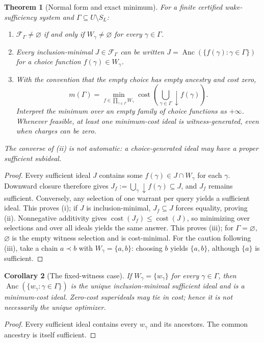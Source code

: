 \documentclass[10pt,letterpaper]{article}
\newtheorem{theorem}{Theorem}[section]
\newtheorem{corollary}[theorem]{Corollary}
\theoremstyle{definition}
\theoremstyle{remark}
\newcommand{\Anc}{\operatorname{Anc}}
\newcommand{\cost}{\operatorname{cost}}
\begin{document}
\begin{theorem}[Normal form and exact minimum]\label{thm:normal}
For a finite certified wake-sufficiency system and $\Gamma\subseteq U\setminus S_L$:
\begin{enumerate}[label=(\roman*)]
\item $\mathcal F_\Gamma\ne\varnothing$ if and only if $W_\gamma\ne\varnothing$ for every $\gamma\in\Gamma$.
\item Every \emph{inclusion-minimal} $J\in\mathcal F_\Gamma$ can be written $J=\Anc(\{f(\gamma):\gamma\in\Gamma\})$ for a choice function $f(\gamma)\in W_\gamma$.
\item With the convention that the empty choice has empty ancestry and cost zero,
\begin{equation}\label{eq:minimum}
m(\Gamma)=\min_{f\in\prod_{\gamma\in\Gamma}W_\gamma}\cost\!\left(\bigcup_{\gamma\in\Gamma}\downarrow f(\gamma)\right).
\end{equation}
Interpret the minimum over an empty family of choice functions as $+\infty$. Whenever feasible, at least one minimum-cost ideal is witness-generated, even when charges can be zero.
\end{enumerate}
The converse of (ii) is \emph{not} automatic: a choice-generated ideal may have a proper sufficient subideal.
\end{theorem}
\begin{proof}
Every sufficient ideal $J$ contains some $f(\gamma)\in J\cap W_\gamma$ for each $\gamma$. Downward closure therefore gives $J_f:=\bigcup_\gamma\downarrow f(\gamma)\subseteq J$, and $J_f$ remains sufficient. Conversely, any selection of one warrant per query yields a sufficient ideal. This proves (i); if $J$ is inclusion-minimal, $J_f\subseteq J$ forces equality, proving (ii). Nonnegative additivity gives $\cost(J_f)\le\cost(J)$, so minimizing over selections and over all ideals yields the same answer. This proves (iii); for $\Gamma=\varnothing$, $\varnothing$ is the empty witness selection and is cost-minimal. For the caution following (iii), take a chain $a\prec b$ with $W_\gamma=\{a,b\}$: choosing $b$ yields $\{a,b\}$, although $\{a\}$ is sufficient.
\end{proof}

\begin{corollary}[The fixed-witness case]
If $W_\gamma=\{w_\gamma\}$ for every $\gamma\in\Gamma$, then $\Anc(\{w_\gamma:\gamma\in\Gamma\})$ is the unique \emph{inclusion-minimal} sufficient ideal and is a minimum-cost ideal. Zero-cost superideals may tie in cost; hence it is not necessarily the unique optimizer.
\end{corollary}
\begin{proof}Every sufficient ideal contains every $w_\gamma$ and its ancestors. The common ancestry is itself sufficient.\end{proof}
\end{document}
